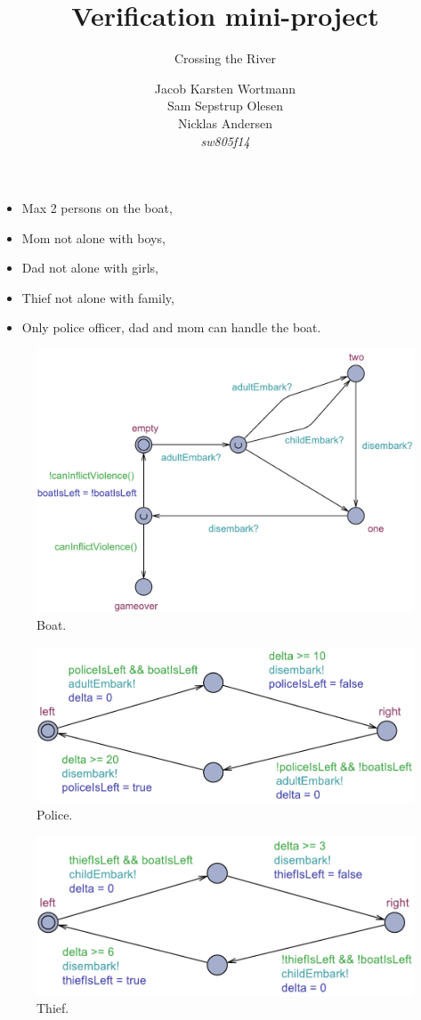 \documentclass[a4paper,12pt]{scrartcl}
\title{Verification mini-project}
\subtitle{Crossing the River}
\author{Jacob Karsten Wortmann\\Sam Sepstrup Olesen\\Nicklas Andersen\\\textit{sw805f14}}
\begin{document}
\maketitle %

\begin{itemize}
\item Max 2 persons on the boat,
\item Mom not alone with boys,
\item Dad not alone with girls,
\item Thief not alone with family,
\item Only police officer, dad and mom can handle the boat.
\end{itemize}

\begin{figure}[h]
\centering
\includegraphics[width=\linewidth]{Boat.pdf}
\caption{Boat.}
\label{fig:boat}
\end{figure}

\begin{figure}[h]
\centering
\includegraphics[width=0.7\linewidth]{Police.pdf}
\caption{Police.}
\label{fig:police}
\end{figure}

\begin{figure}[h]
\centering
\includegraphics[width=0.7\linewidth]{Thief.pdf}
\caption{Thief.}
\label{fig:thief}
\end{figure}
\end{document}
